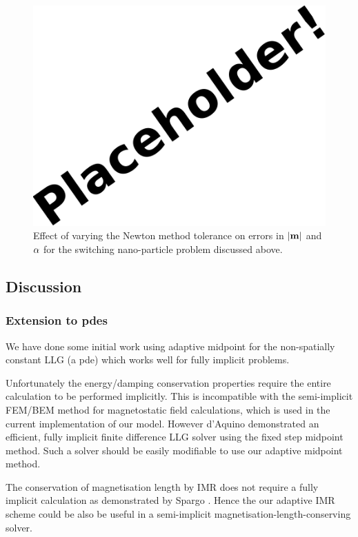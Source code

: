\begin{figure}[ht!]
  \centering
  \includegraphics{images/placeholder}
  \caption{Effect of varying the Newton method tolerance on errors in $\lvert \mathbf{m} \rvert$ and $\alpha$  for the switching nano-particle problem discussed above.}
  \label{fig:newton-tol-errors-mp}
\end{figure}


\subsection{Discussion}

\subsubsection{Extension to pdes}

We have done some initial work using adaptive midpoint for the non-spatially constant LLG (\ie a pde) which works well for fully implicit problems.

Unfortunately the energy/damping conservation properties require the entire calculation to be performed implicitly.
This is incompatible with the semi-implicit FEM/BEM method for magnetostatic field calculations,\cite{Koehler1997} which is used in the current implementation of our model.
However d'Aquino \etal demonstrated an efficient, fully implicit finite difference LLG solver using the fixed step midpoint method\cite{DAquino2005}.
Such a solver should be easily modifiable to use our adaptive midpoint method.

The conservation of magnetisation length by IMR does not require a fully implicit calculation as demonstrated by Spargo \etal\cite{Spargo2003a}.
Hence the our adaptive IMR scheme could be also be useful in a semi-implicit magnetisation-length-conserving solver.


